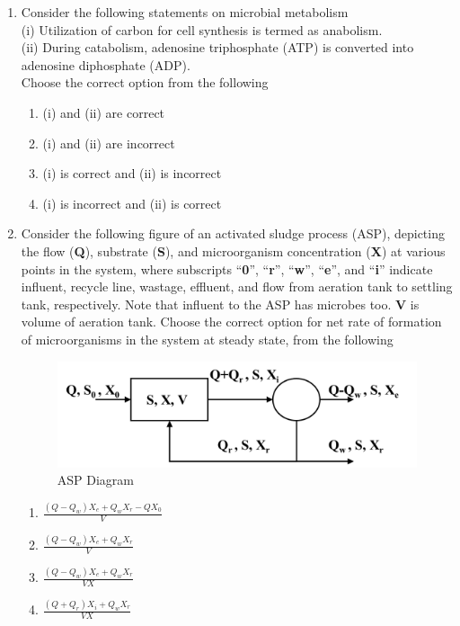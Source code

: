 \documentclass[journal]{IEEEtran}
\begin{document}
\begin{enumerate}[resume]
\item Consider the following statements on microbial metabolism \\
(i) Utilization of carbon for cell synthesis is termed as anabolism. \\
(ii) During catabolism, adenosine triphosphate (ATP) is converted into adenosine diphosphate (ADP). \\
Choose the correct option from the following
\hfill{}
\begin{enumerate}
\item (i) and (ii) are correct
\item (i) and (ii) are incorrect
\item (i) is correct and (ii) is incorrect
\item (i) is incorrect and (ii) is correct
\end{enumerate}

\item Consider the following figure of an activated sludge process (ASP), depicting the flow (\textbf{Q}), substrate (\textbf{S}), and microorganism concentration (\textbf{X}) at various points in the system, where subscripts ``\textbf{0}'', ``\textbf{r}'', ``\textbf{w}'', ``\textbf{e}'', and ``\textbf{i}'' indicate influent, recycle line, wastage, effluent, and flow from aeration tank to settling tank, respectively. Note that influent to the ASP has microbes too. \textbf{V} is volume of aeration tank. Choose the correct option for net rate of formation of microorganisms in the system at steady state, from the following
\hfill{}
\begin{figure}[H]
    \centering
    \includegraphics[width=\columnwidth]{figs/fig12.png}
    \caption{ASP Diagram}
    \label{fig12}
\end{figure}
\begin{enumerate}
\item $\frac{(Q-Q_w)X_e + Q_wX_r - QX_0}{V}$
\item $\frac{(Q-Q_w)X_e + Q_wX_r}{V}$
\item $\frac{(Q-Q_w)X_e + Q_wX_r}{VX}$
\item $\frac{(Q+Q_r)X_i + Q_wX_r}{VX}$
\end{enumerate}


\end{enumerate}
\end{document}
